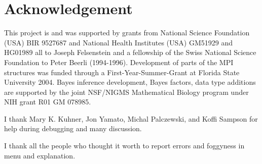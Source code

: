\section{Acknowledgement}
This project is and was supported by grants from National Science 
Foundation (USA) BIR 9527687 and National Health Institutes (USA)
GM51929 and HG01989 all to Joseph Felsenstein and a fellowship of the Swiss National 
Science Foundation to Peter Beerli (1994-1996). 
Development of parts of the MPI structures was funded through a First-Year-Summer-Grant at Florida State University 2004.
Bayes inference development, Bayes factors, data type additions are supported by the joint NSF/NIGMS Mathematical Biology 
program under NIH grant R01 GM 078985.
\par
I thank Mary K. Kuhner, Jon Yamato, Michal Palczewski, and Koffi Sampson for help during debugging and many discussion.
\par
I thank all the people who thought it  worth to report errors and 
foggyness in menu and explanation.

\newpage
